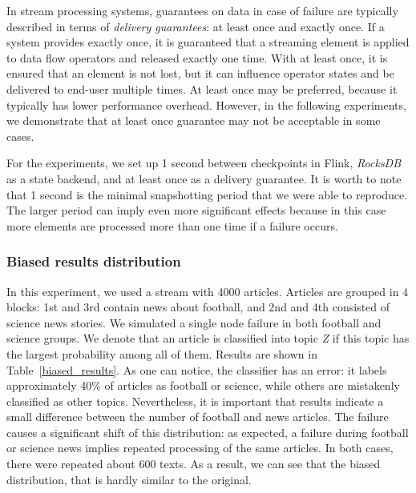In stream processing systems, guarantees on data in case of failure are typically described in terms of {\em delivery guarantees}: at least once and exactly once. If a system provides exactly once, it is guaranteed that a streaming element is applied to data flow operators and released exactly one time. With at least once, it is ensured that an element is not lost, but it can influence operator states and be delivered to end-user multiple times. At least once may be preferred, because it typically has lower performance overhead. However, in the following experiments, we demonstrate that at least once guarantee may not be acceptable in some cases. 

For the experiments, we set up 1 second between checkpoints in Flink, {\em RocksDB} as a state backend, and at least once as a delivery guarantee. It is worth to note that 1 second is the minimal snapshotting period that we were able to reproduce. The larger period can imply even more significant effects because in this case more elements are processed more than one time if a failure occurs.

\subsubsection{Biased results distribution}

In this experiment, we used a stream with 4000 articles. Articles are grouped in 4 blocks: 1st and 3rd contain news about football, and 2nd and 4th consisted of science news stories. We simulated a single node failure in both football and science groups. We denote that an article is classified into topic {\em Z} if this topic has the largest probability among all of them. Results are shown in Table~\ref{biased_results}. As one can notice, the classifier has an error: it labels approximately 40\% of articles as football or science, while others are mistakenly classified as other topics. Nevertheless, it is important that results indicate a small difference between the number of football and news articles. The failure causes a significant shift of this distribution: as expected, a failure during football or science news implies repeated processing of the same articles. In both cases, there were repeated about 600 texts. As a result, we can see that the biased distribution, that is hardly similar to the original.  

